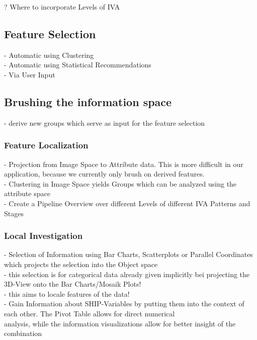\documentclass[journal]{style/vgtc}           %
\begin{document}
? Where to incorporate Levels of IVA

\subsection{Feature Selection}
- Automatic using Clustering\\
- Automatic using Statistical Recommendations\\
- Via User Input

\subsection{Brushing the information space} 
- derive new groups which serve as input for the feature selection

\subsubsection{Feature Localization}
- Projection from Image Space to Attribute data. This is more difficult in our application, because we currently only brush on derived features.\\
- Clustering in Image Space yields Groups which can be analyzed using the attribute space\\
- Create a Pipeline Overview over different Levels of different IVA Patterns and Stages

\subsubsection{Local Investigation}
- Selection of Information using Bar Charts, Scatterplots or Parallel Coordinates which projects the selection into the Object space\\
- this selection is for categorical data already given implicitly bei projecting the 3D-View onto the Bar Charts/Mosaik Plots!\\
- this aims to locale features of the data!\\
- Gain Information about SHIP-Variables by putting them into the context of each other. The Pivot Table allows for direct numerical\\ analysis, while the information visualizations allow for better insight of the combination
\end{document}
